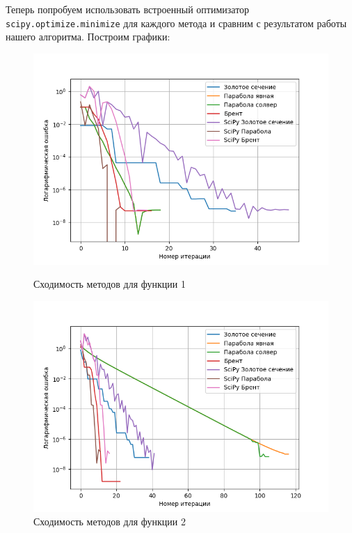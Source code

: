\documentclass[a4paper,12pt]{article}
\begin{document}
Теперь попробуем использовать встроенный оптимизатор \texttt{scipy.optimize.minimize} для каждого метода и сравним с результатом работы нашего алгоритма. Построим графики:
\begin{figure}[H]
    \begin{minipage}{0.49\textwidth}
                \centering \includegraphics[width=\textwidth]{images/task1/f1_with_scipy.png}
        \caption{Сходимость методов для функции 1}
    \end{minipage}\hfill
    \begin{minipage}{0.49\textwidth}
        \centering \includegraphics[width=\textwidth]{images/task1/f2_with_scipy.png}
        \caption{Сходимость методов для функции 2}
    \end{minipage}
\end{figure}
\end{document}
